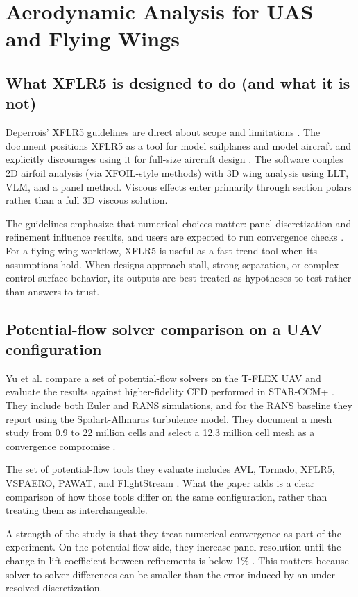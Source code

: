 \chapter{Aerodynamic Analysis for UAS and Flying Wings}
\section{What XFLR5 is designed to do (and what it is not)}
Deperrois' XFLR5 guidelines are direct about scope and limitations \cite{Deperrois2009XFLR5}. The document positions XFLR5 as a tool for model sailplanes and model aircraft and explicitly discourages using it for full-size aircraft design \cite{Deperrois2009XFLR5}. The software couples 2D airfoil analysis (via XFOIL-style methods) with 3D wing analysis using LLT, VLM, and a panel method. Viscous effects enter primarily through section polars rather than a full 3D viscous solution.

The guidelines emphasize that numerical choices matter: panel discretization and refinement influence results, and users are expected to run convergence checks \cite{Deperrois2009XFLR5}. For a flying-wing workflow, XFLR5 is useful as a fast trend tool when its assumptions hold. When designs approach stall, strong separation, or complex control-surface behavior, its outputs are best treated as hypotheses to test rather than answers to trust.

\section{Potential-flow solver comparison on a UAV configuration}
Yu et al. compare a set of potential-flow solvers on the T-FLEX UAV and evaluate the results against higher-fidelity CFD performed in STAR-CCM+ \cite{Yu2022ICAS}. They include both Euler and RANS simulations, and for the RANS baseline they report using the Spalart-Allmaras turbulence model. They document a mesh study from 0.9 to 22 million cells and select a 12.3 million cell mesh as a convergence compromise \cite{Yu2022ICAS}.

The set of potential-flow tools they evaluate includes AVL, Tornado, XFLR5, VSPAERO, PAWAT, and FlightStream \cite{Yu2022ICAS}. What the paper adds is a clear comparison of how those tools differ on the same configuration, rather than treating them as interchangeable.

A strength of the study is that they treat numerical convergence as part of the experiment. On the potential-flow side, they increase panel resolution until the change in lift coefficient between refinements is below 1\% \cite{Yu2022ICAS}. This matters because solver-to-solver differences can be smaller than the error induced by an under-resolved discretization.

